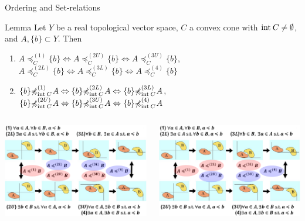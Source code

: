 \documentclass[aspectratio=169, dvipdfmx, 11pt]{beamer}
\newcommand{\Interior}[1]{\text{\rm int\:${#1}$}} %
\newcommand{\setrel}[2]{\preccurlyeq^{(#1)}_{#2}\!}
\newcommand{\notsetrel}[2]{{\not\preccurlyeq}^{(#1)}_{#2}\!}
\begin{document}
\begin{frame}{Ordering and Set-relations}
  \begin{block}{Lemma}
    Let $Y$ be a real topological vector space, $C$ a convex cone
    with $\Interior{C} \ne \emptyset$, and $A, \{b\} \subset Y$. Then
    \begin{enumerate}
      \item $A \setrel{1}{C} \{b\} \Leftrightarrow A \setrel{2U}{C} \{b\} \Leftrightarrow A \setrel{3U}{C} \{b\}$,\:
            $A \setrel{2L}{C} \{b\} \Leftrightarrow A \setrel{3L}{C} \{b\} \Leftrightarrow A \setrel{4}{C} \{b\}$
      \item $\{b\} \notsetrel{1}{\Interior{C}}\:A \Leftrightarrow \{b\} \notsetrel{2L}{\Interior{C}}\:A \Leftrightarrow \{b\} \notsetrel{3L}{\Interior{C}}\:A$,\:
            $\{b\} \notsetrel{2U}{\Interior{C}}\:A \Leftrightarrow \{b\} \notsetrel{3U}{\Interior{C}}\:A \Leftrightarrow \{b\} \notsetrel{4}{\Interior{C}}\:A$
    \end{enumerate}
  \end{block}
  \centering
  \begin{columns}
    \begin{column}{0.48\textwidth}
      \centering
      \includegraphics[keepaspectratio, scale=0.23]{figures/eps/case2_set_relations.eps}
    \end{column}
    \begin{column}{0.48\textwidth}
      \centering
      \includegraphics[keepaspectratio, scale=0.23]{figures/eps/case1_set_relations.eps}

\end{column}
\end{columns}
\end{frame}
\end{document}
